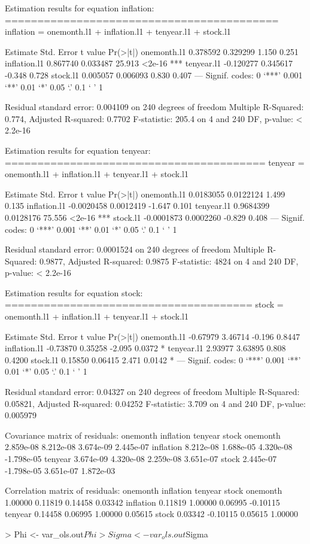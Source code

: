 \documentclass[12pt]{article}
\begin{document}
\begin{Schunk}
\begin{Soutput}
Estimation results for equation inflation: 
========================================== 
inflation = onemonth.l1 + inflation.l1 + tenyear.l1 + stock.l1 

              Estimate Std. Error t value Pr(>|t|)    
onemonth.l1   0.378592   0.329299   1.150    0.251    
inflation.l1  0.867740   0.033487  25.913   <2e-16 ***
tenyear.l1   -0.120277   0.345617  -0.348    0.728    
stock.l1      0.005057   0.006093   0.830    0.407    
---
Signif. codes:  0 ‘***’ 0.001 ‘**’ 0.01 ‘*’ 0.05 ‘.’ 0.1 ‘ ’ 1


Residual standard error: 0.004109 on 240 degrees of freedom
Multiple R-Squared: 0.774,	Adjusted R-squared: 0.7702 
F-statistic: 205.4 on 4 and 240 DF,  p-value: < 2.2e-16 


Estimation results for equation tenyear: 
======================================== 
tenyear = onemonth.l1 + inflation.l1 + tenyear.l1 + stock.l1 

               Estimate Std. Error t value Pr(>|t|)    
onemonth.l1   0.0183055  0.0122124   1.499    0.135    
inflation.l1 -0.0020458  0.0012419  -1.647    0.101    
tenyear.l1    0.9684399  0.0128176  75.556   <2e-16 ***
stock.l1     -0.0001873  0.0002260  -0.829    0.408    
---
Signif. codes:  0 ‘***’ 0.001 ‘**’ 0.01 ‘*’ 0.05 ‘.’ 0.1 ‘ ’ 1


Residual standard error: 0.0001524 on 240 degrees of freedom
Multiple R-Squared: 0.9877,	Adjusted R-squared: 0.9875 
F-statistic:  4824 on 4 and 240 DF,  p-value: < 2.2e-16 


Estimation results for equation stock: 
====================================== 
stock = onemonth.l1 + inflation.l1 + tenyear.l1 + stock.l1 

             Estimate Std. Error t value Pr(>|t|)  
onemonth.l1  -0.67979    3.46714  -0.196   0.8447  
inflation.l1 -0.73870    0.35258  -2.095   0.0372 *
tenyear.l1    2.93977    3.63895   0.808   0.4200  
stock.l1      0.15850    0.06415   2.471   0.0142 *
---
Signif. codes:  0 ‘***’ 0.001 ‘**’ 0.01 ‘*’ 0.05 ‘.’ 0.1 ‘ ’ 1


Residual standard error: 0.04327 on 240 degrees of freedom
Multiple R-Squared: 0.05821,	Adjusted R-squared: 0.04252 
F-statistic: 3.709 on 4 and 240 DF,  p-value: 0.005979 



Covariance matrix of residuals:
           onemonth  inflation   tenyear      stock
onemonth  2.859e-08  8.212e-08 3.674e-09  2.445e-07
inflation 8.212e-08  1.688e-05 4.320e-08 -1.798e-05
tenyear   3.674e-09  4.320e-08 2.259e-08  3.651e-07
stock     2.445e-07 -1.798e-05 3.651e-07  1.872e-03

Correlation matrix of residuals:
          onemonth inflation tenyear    stock
onemonth   1.00000   0.11819 0.14458  0.03342
inflation  0.11819   1.00000 0.06995 -0.10115
tenyear    0.14458   0.06995 1.00000  0.05615
stock      0.03342  -0.10115 0.05615  1.00000
\end{Soutput}
\begin{Sinput}
> Phi <- var_ols.out$Phi
> Sigma <- var_ols.out$Sigma
\end{Sinput}
\end{Schunk}
\end{document}
